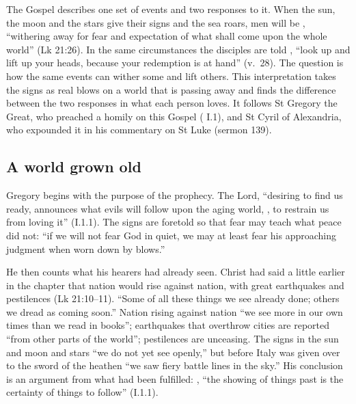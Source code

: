 
The Gospel describes one set of events and two responses to it. When the sun,
the moon and the stars give their signs and the sea roars, men will be
, ``withering away for
fear and expectation of what shall come upon the whole world'' (Lk 21:26).
In the same circumstances the disciples are told , ``look up and lift up your heads, because your redemption is
at hand'' (v.~28). The question is how the same events can wither some and
lift others. This interpretation takes the signs as real blows on a world
that is passing away and finds the difference between the two responses in
what each person loves. It follows St Gregory the Great, who preached a
homily on this Gospel ( I.1), and St Cyril of
Alexandria, who expounded it in his commentary on St Luke (sermon 139).

\subsection{A world grown old}

Gregory begins with the purpose of the prophecy. The Lord, ``desiring to find
us ready, announces what evils will follow upon the aging world, , to restrain us from loving it'' (I.1.1). The signs
are foretold so that fear may teach what peace did not: ``if we will not fear
God in quiet, we may at least fear his approaching judgment when worn down by
blows.''

He then counts what his hearers had already seen. Christ had said a little
earlier in the chapter that nation would rise against nation, with great
earthquakes and pestilences (Lk 21:10--11). ``Some of all these things we see
already done; others we dread as coming soon.'' Nation rising against nation
``we see more in our own times than we read in books''; earthquakes that
overthrow cities are reported ``from other parts of the world''; pestilences
are unceasing. The signs in the sun and moon and stars ``we do not yet see
openly,'' but before Italy was given over to the sword of the heathen ``we saw
fiery battle lines in the sky.'' His conclusion is an argument from what had
been fulfilled: , ``the showing of things past is the certainty of things to
follow'' (I.1.1).

